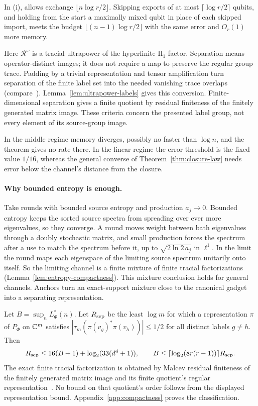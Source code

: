 In (i), \cite[Theorem~8.6]{DouglasMghirbiB} allows exchange $\lfloor n\log r/2\rfloor$. Skipping exports of at most
$\lceil\log r/2\rceil$ qubits, and holding from the start a maximally mixed qubit in place of each skipped import, meets the
budget $\lfloor(n-1)\log r/2\rfloor$ with the same error and $O_r(1)$ more memory.

Here $\mathcal R^\omega$ is a tracial ultrapower of the hyperfinite
$\mathrm{II}_1$ factor. Separation means operator-distinct images;
it does not require a map to preserve the regular group trace.
Padding by a trivial representation and tensor amplification turn
separation of the finite label set into the needed vanishing trace
overlaps (compare~\cite[Lemma~2.2 and the proof of Lemma~2.6]{SlofstraVidick2018}). Lemma~\ref{lem:ultrapower-labels} gives this conversion.
Finite-dimensional separation gives a finite quotient by residual
finiteness of the finitely generated matrix image. These criteria
concern the presented label group, not every element of its
source-group image.

In the middle regime memory diverges, possibly no faster than $\log n$, and the theorem gives no rate there.
In the linear regime the error threshold is the fixed value $1/16$, whereas the general converse of
Theorem~\ref{thm:closure-law} needs error below the channel's distance from the closure.

\paragraph{Why bounded entropy is enough.}
Take rounds with bounded source entropy and production $a_j\to0$. Bounded entropy keeps the sorted
source spectra from spreading over ever more eigenvalues, so they converge. A round moves weight
between bath eigenvalues through a doubly stochastic matrix, and small production forces the spectrum
after a use to match the spectrum before it, up to $\sqrt{2\ln2\,a_j}$ in $\ell^1$. In the limit the
round maps each eigenspace of the limiting source spectrum unitarily onto itself. So the limiting channel
is a finite mixture of finite tracial factorizations (Lemma~\ref{lem:entropy-compactness}).
This mixture conclusion holds for general channels. Anchors turn an exact-support mixture close to
the canonical gadget into a separating representation.

Let $B=\sup_n L^*_\Phi(n)$. Let $R_{\rm sep}$ be the least $\log m$ for which a representation $\pi$ of
$P_\Phi$ on $\mathbb C^m$ satisfies $|\tau_m(\pi(v_g)^*\pi(v_h))|\le1/2$ for all distinct labels $g\ne h$. Then
\[
 R_{\rm sep}\le16(B+1)+\log_2(33(d^4+1)),\qquad
 B\le\lceil\log_2(8r(r-1))\rceil R_{\rm sep}.
\]
The exact finite tracial factorization is obtained by Malcev residual finiteness of the finitely generated
matrix image and its finite quotient's regular representation~\cite{Nica2013}. No bound on that quotient's
order follows from the displayed representation bound. Appendix~\ref{app:compactness} proves the classification.

